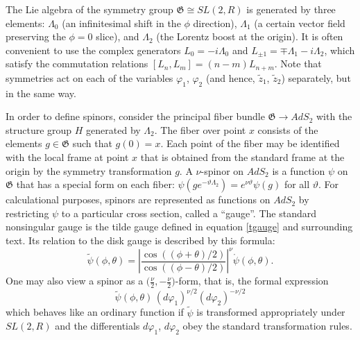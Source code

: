 \documentclass[12pt]{article}
\newcommand{\vp}{\varphi}
\newcommand{\vt}{\vartheta}
\newcommand{\RR}{\mathbb{R}}
\DeclareMathOperator{\SL}{SL}
\DeclareMathOperator{\AdS}{AdS}
\newcommand{\GG}{\mathfrak{G}}
\newcommand{\tGG}{\widetilde{\GG}}
\newcommand{\tz}{\tilde{z}}
\newcommand{\tpsi}{\tilde{\psi}}
\newcommand{\rpsi}{\mathring{\psi}}
\def\widetilde#1{#1}%
\def\AdS{AdS}
\def\SL{SL}
\def\RR{R}
\begin{document}
The Lie algebra of the symmetry group $\tGG\cong\widetilde{\SL}(2,\RR)$ is generated by three elements: $\Lambda_0$ (an infinitesimal shift in the $\phi$ direction), $\Lambda_1$ (a certain vector field preserving the $\phi=0$ slice), and $\Lambda_2$ (the Lorentz boost at the origin). It is often convenient to use the complex generators $L_{0}=-i\Lambda_0$ and $L_{\pm1}=\mp\Lambda_1-i\Lambda_2$, which satisfy the commutation relations $[L_n,L_m]=(n-m)L_{n+m}$. Note that symmetries act on each of the variables $\vp_1$, $\vp_2$ (and hence, $\tz_1$, $\tz_2$) separately, but in the same way.

In order to define spinors, consider the principal fiber bundle $\tGG\to\widetilde{\AdS}_2$ with the structure group $H$ generated by $\Lambda_2$. The fiber over point $x$ consists of the elements $g\in\tGG$ such that $g(0)=x$. Each point of the fiber may be identified with the local frame at point $x$ that is obtained from the standard frame at the origin by the symmetry transformation $g$. A $\nu$-spinor on $\widetilde{\AdS}_2$ is a function $\psi$ on $\tGG$ that has a special form on each fiber: $\psi(ge^{-\vt\Lambda_2})=e^{\nu\vt}\psi(g)$ for all $\vt$. For calculational purposes, spinors are represented as functions on $\widetilde{\AdS}_2$ by restricting $\psi$ to a particular cross section, called a ``gauge''. The standard nonsingular gauge is the tilde gauge defined in equation \eqref{tgauge} and surrounding text. Its relation to the disk gauge is described by this formula:
\begin{equation}\label{tilde_to_disk}
\tpsi(\phi,\theta)
=\left|\frac{\cos((\phi+\theta)/2)}{\cos((\phi-\theta)/2)}\right|^{\nu}
\rpsi(\phi,\theta).
\end{equation}
One may also view a spinor as a $\bigl(\frac{\nu}{2}, -\frac{\nu}{2}\bigr)$-form, that is, the formal expression
\begin{equation}\label{nunu-form}
\tpsi(\phi,\theta)\,(d\vp_1)^{\nu/2}(d\vp_2)^{-\nu/2}
\end{equation}
which behaves like an ordinary function if $\tpsi$ is transformed appropriately under $\widetilde{\SL}(2,\RR)$ and the differentials $d\vp_1$, $d\vp_2$ obey the standard transformation rules.
\end{document}
